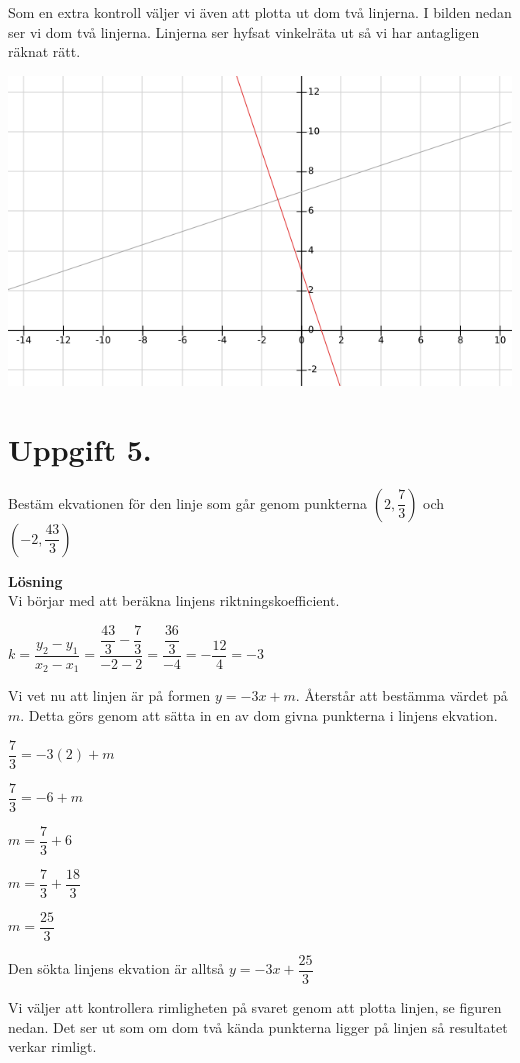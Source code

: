\documentclass{article}
\begin{document}
Som en extra kontroll väljer vi även att plotta ut dom två linjerna. I bilden nedan ser vi dom två linjerna. Linjerna ser hyfsat vinkelräta ut så vi har antagligen räknat rätt.

\includegraphics[scale=0.65]{graph_1_4_1.png}

\section*{Uppgift 5.}
Bestäm ekvationen för den linje som går genom punkterna $(2,\dfrac{7}{3})$ och $(-2,\dfrac{43}{3})$

\textbf{Lösning}\\
Vi börjar med att beräkna linjens riktningskoefficient.

$k=\dfrac{y_{2}-y_{1}}{x_{2}-x_{1}}=\dfrac{\dfrac{43}{3}-\dfrac{7}{3}}{-2-2}=\dfrac{\dfrac{36}{3}}{-4}=-\dfrac{12}{4}=-3$

Vi vet nu att linjen är på formen $y=-3x+m$. Återstår att bestämma värdet på $m$. Detta görs genom att sätta in en av dom givna punkterna i linjens ekvation.

$\dfrac{7}{3}=-3(2)+m$

$\dfrac{7}{3}=-6+m$

$m=\dfrac{7}{3}+6$

$m=\dfrac{7}{3}+\dfrac{18}{3}$

$m=\dfrac{25}{3}$

Den sökta linjens ekvation är alltså $y=-3x+\dfrac{25}{3}$

Vi väljer att kontrollera rimligheten på svaret genom att plotta linjen, se figuren nedan. Det ser ut som om dom två kända punkterna ligger på linjen så resultatet verkar rimligt.
\end{document}
